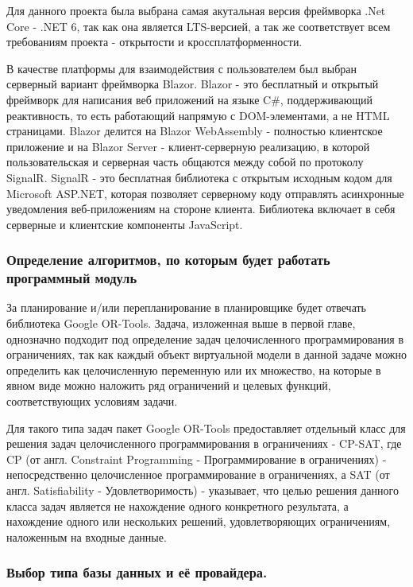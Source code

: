 Для данного проекта была выбрана самая акутальная версия фреймворка .Net Core - .NET 6, так как она является LTS-версией, а так же соответствует всем требованиям проекта - открытости и кроссплатформенности.

В качестве платформы для взаимодействия с пользователем был выбран серверный вариант фреймворка Blazor. Blazor - это бесплатный и открытый фреймворк для написания веб приложений на языке C\#, поддерживающий реактивность, то есть работающий напрямую с DOM-элементами, а не HTML страницами. Blazor делится на Blazor WebAssembly - полностью клиентское приложение и на Blazor Server - клиент-серверную реализацию, в которой пользовательская и серверная часть общаются между собой по протоколу SignalR. SignalR - это бесплатная библиотека с открытым исходным кодом для Microsoft ASP.NET, которая позволяет серверному коду отправлять асинхронные уведомления веб-приложениям на стороне клиента. Библиотека включает в себя серверные и клиентские компоненты JavaScript.



\subsubsection{Определение алгоритмов, по которым будет работать программный модуль}

За планирование и/или перепланирование в планировщике будет отвечать библиотека Google OR-Tools. Задача, изложенная выше в первой главе, однозначно подходит под определение задач целочисленного программирования в ограничениях, так как каждый объект виртуальной модели в данной задаче можно определить как целочисленную переменную или их множество, на которые в явном виде можно наложить ряд ограничений и целевых функций, соответствующих условиям задачи.

Для такого типа задач пакет Google OR-Tools предоставляет отдельный класс для решения задач целочисленного программирования в ограничениях - CP-SAT, где CP (от англ. Constraint Programming - Программирование в ограничениях) - непосредственно целочисленное программирование в ограничениях, а SAT (от англ. Satisfiability - Удовлетворимость) - указывает, что целью решения данного класса задач является не нахождение одного конкретного результата, а нахождение одного или нескольких решений, удовлетворяющих ограничениям, наложенным на входные данные.
 
\subsubsection{Выбор типа базы данных и её провайдера.}

